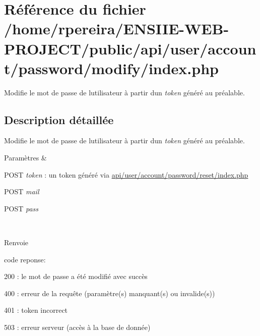 \hypertarget{user_2account_2password_2modify_2index_8php}{}\section{Référence du fichier /home/rpereira/\+E\+N\+S\+I\+I\+E-\/\+W\+E\+B-\/\+P\+R\+O\+J\+E\+C\+T/public/api/user/account/password/modify/index.php}
\label{user_2account_2password_2modify_2index_8php}


Modifie le mot de passe de l\textquotesingle{}utilisateur à partir d\textquotesingle{}un {\itshape token} généré au préalable.  




\subsection{Description détaillée}
Modifie le mot de passe de l\textquotesingle{}utilisateur à partir d\textquotesingle{}un {\itshape token} généré au préalable. 


\begin{DoxyParams}{Paramètres}
{\em } & 
\begin{DoxyItemize}
\item P\+O\+ST {\itshape token} \+: un token généré via \hyperlink{user_2account_2password_2reset_2index_8php}{api/user/account/password/reset/index.\+php}
\item P\+O\+ST {\itshape mail} 
\item P\+O\+ST {\itshape pass} 
\end{DoxyItemize}\\
\hline
\end{DoxyParams}
\begin{DoxyReturn}{Renvoie}

\begin{DoxyItemize}
\item code reponse\+:
\begin{DoxyItemize}
\item 200 \+: le mot de passe a été modifié avec succès
\item 400 \+: erreur de la requête (paramètre(s) manquant(s) ou invalide(s))
\item 401 \+: token incorrect
\item 503 \+: erreur serveur (accès à la base de donnée) 
\end{DoxyItemize}
\end{DoxyItemize}
\end{DoxyReturn}
